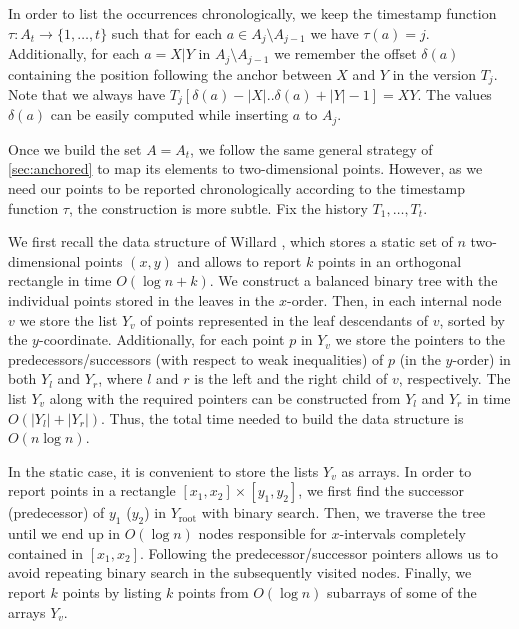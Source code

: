 \documentclass[a4paper]{article}
\theoremstyle{remark}
\begin{document}
In order to list the occurrences chronologically, we keep the timestamp
function $\tau:A_t\to \{1,\ldots,t\}$ such that for each
$a\in A_j\setminus A_{j-1}$ we have $\tau(a)=j$.
Additionally, for each $a=X|Y$ in $A_{j}\setminus A_{j-1}$ we remember
the offset $\delta(a)$ containing the position following the
anchor between $X$ and $Y$ in the version $T_j$.
Note that we always have $T_j[\delta(a)-|X|..\delta(a)+|Y|-1]=XY$.
The values $\delta(a)$ can be easily computed while inserting $a$ to $A_j$.

Once we build the set $A=A_t$, we follow the same general strategy of
\cref{sec:anchored} to map its elements to two-dimensional points.
However, as we need our points to be reported chronologically according
to the timestamp function $\tau$, the construction is more subtle.
Fix the history $T_1,\ldots,T_t$.

We first recall the data structure of Willard \cite{Willard:1985}, which stores
a static set of $n$ two-dimensional points $(x,y)$ and allows to report $k$
points in an orthogonal rectangle in time $O(\log{n}+k)$.
We construct a balanced binary tree with
the individual points stored in the leaves in the $x$-order.
Then, in each internal node $v$ we store the list $Y_v$ of points
represented in the leaf descendants of $v$, sorted by the $y$-coordinate.
Additionally, for each point $p$ in $Y_v$ we store the pointers to the
predecessors/successors (with respect to weak inequalities)
of $p$ (in the $y$-order) in both $Y_l$ and $Y_r$, where $l$ and $r$
is the left and the right child of $v$, respectively.
The list $Y_v$ along with the required pointers can be constructed
from $Y_l$ and $Y_r$ in time $O(|Y_l|+|Y_r|)$.
Thus, the total time needed to build the data structure is $O(n\log{n})$.

In the static case, it is convenient to store the lists $Y_v$ as arrays.
In order to report points in a rectangle $[x_1,x_2]\times [y_1,y_2]$,
we first find the successor (predecessor) of $y_1$ ($y_2$) in $Y_{\text{root}}$
with binary search.
Then, we traverse the tree until we end up in $O(\log{n})$ nodes
responsible for $x$-intervals completely contained in $[x_1,x_2]$.
Following the predecessor/successor pointers allows us to avoid repeating
binary search in the subsequently visited nodes.
Finally, we report $k$ points by listing $k$ points from
$O(\log{n})$ subarrays of some of the arrays $Y_v$.
\end{document}

